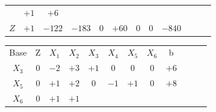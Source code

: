 \begin{frame}
{\begin{table}
\begin{tabular}{c c c c c c c c c c c c}
				& \cellcolor{yellow!50} $\scriptstyle +1$
				& \cellcolor{yellow!50} $\scriptstyle +6$ \\
				\cellcolor{blue!100} \color{white} $\scriptstyle Z$
				& \cellcolor{yellow!50} $\scriptstyle +1$
				& \cellcolor{yellow!50} $\scriptstyle -122$
				& \cellcolor{yellow!50} $\scriptstyle -183$
				& \cellcolor{yellow!50} $\scriptstyle 0$
				& \cellcolor{yellow!50} $\scriptstyle +60$
				& \cellcolor{yellow!50} $\scriptstyle 0$
				& \cellcolor{yellow!50} $\scriptstyle 0$ 
				& \cellcolor{yellow!50} $\scriptstyle -840$  \\
			\end{tabular}
		\end{table}			
	}
	{
		\begin{table}		
			\begin{tabular}{c c c c c c c c c c c c}
				\cline{1-8} 
				\cellcolor{blue!100} \color{white} \scriptsize Base 
				&\cellcolor{blue!100} \color{white} \scriptsize Z 
				&\cellcolor{blue!100} \color{white} $\scriptstyle X_1$ 
				&\cellcolor{blue!100} \color{white} $\scriptstyle X_2$ 
				&\cellcolor{blue!100} \color{red}   $\scriptstyle X_3$ 
				&\cellcolor{blue!100} \color{white} $\scriptstyle X_4$ 
				&\cellcolor{blue!100} \color{red}   $\scriptstyle X_5$ 
				&\cellcolor{blue!100} \color{red}   $\scriptstyle X_6$ 
				&\cellcolor{blue!100} \color{white} \scriptsize b
				&
				&
				& \\
				\cellcolor{blue!100} \color{red} $\scriptstyle X_3$
				& \cellcolor{yellow!50} $\scriptstyle 0$
				& \cellcolor{yellow!50} $\scriptstyle -2$
				& \cellcolor{gray!50} $\scriptstyle +3$
				& \cellcolor{yellow!50} $\scriptstyle +1$
				& \cellcolor{yellow!50} $\scriptstyle 0$
				& \cellcolor{yellow!50} $\scriptstyle 0$
				& \cellcolor{yellow!50} $\scriptstyle 0$
				& \cellcolor{yellow!50} $\scriptstyle +6$ \\
			    \cellcolor{blue!100} \color{red} $\scriptstyle X_5$
				& \cellcolor{yellow!50} $\scriptstyle 0$
				& \cellcolor{yellow!50} $\scriptstyle +1$
				& \cellcolor{gray!50} $\scriptstyle +2$
				& \cellcolor{yellow!50} $\scriptstyle 0$			
				& \cellcolor{yellow!50} $\scriptstyle -1$
				& \cellcolor{yellow!50} $\scriptstyle +1$
				& \cellcolor{yellow!50} $\scriptstyle 0$ 
				& \cellcolor{yellow!50} $\scriptstyle +8$ \\
				\cellcolor{blue!100} \color{red} $\scriptstyle X_6$
				& \cellcolor{yellow!50} $\scriptstyle 0$
				& \cellcolor{yellow!50} $\scriptstyle +1$
				& \cellcolor{gray!50} $\scriptstyle +1$

\end{tabular}
\end{table}}
\end{frame}
